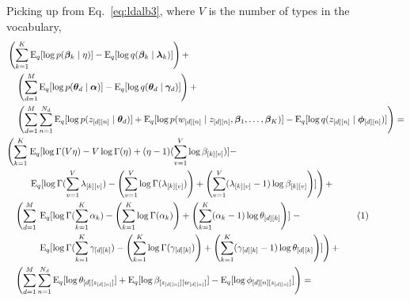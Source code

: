 \documentclass[12pt]{article}
\newcommand\numberthis{\addtocounter{equation}{1}\tag{\theequation}}
\newcommand{\E}{\operatorname{E}}
\begin{document}
Picking up from Eq.~\ref{eq:ldalb3}, where $V$ is the number of types in the
vocabulary,
\begin{align*}
    &\begin{aligned}
    &\left(\sum_{k=1}^{K} \E_{q}[\log p(\bm{\beta}_{k} \mid \eta)] - \E_{q}[\log
    q(\bm{\beta}_{k} \mid \bm{\lambda}_{k})]\right) + \\*
    &\quad\left(\sum_{d=1}^{M} \E_{q}[\log p(\bm{\theta}_{d} \mid \bm{\alpha})]
    - \E_{q}[\log q(\bm{\theta}_{d} \mid \bm{\gamma}_{d})]\right) + \\*
    &\quad\left(\sum_{d=1}^{M}\sum_{n=1}^{N_{d}} \E_{q}[\log p(z_{[d][n]} \mid
    \bm{\theta}_{d})] + \E_{q}[\log p(w_{[d][n]} \mid z_{[d][n]}, \bm{\beta}_{1},
    \ldots, \bm{\beta}_{K})] - \E_{q}[\log q(z_{[d][n]} \mid
    \bm{\phi}_{[d][n]})]\right) =
    \end{aligned}\\
    &\begin{aligned}
    &\begin{aligned}\left(\sum_{k=1}^{K} \right. &\E_{q}[ \log \Gamma(V\eta) -
    V \log \Gamma(\eta) + (\eta - 1) (\sum_{v=1}^{V} \log \beta_{[k][v]}) ] -
    \\*
    &\left. \E_{q} [ \log
    \Gamma(\sum_{v=1}^{V} \lambda_{[k][v]}) - \left(\sum_{v=1}^{V} \log
    \Gamma(\lambda_{[k][v]})\right) + \left(\sum_{v=1}^{V} (\lambda_{[k][v]} - 1) \log
    \beta_{[k][v]}\right)]\right) +\end{aligned} \\*
    &\quad\begin{aligned}\left(\sum_{d=1}^{M}\right. &\left.\E_{q}[\log \Gamma
    (\sum_{k=1}^{K}
    \alpha_{k}) - \left(\sum_{k=1}^{K}\log \Gamma(\alpha_{k})\right) +
    \left(\sum_{k=1}^{K}(\alpha_{k} - 1)\log \theta_{[d][k]}\right)]\right. -
    \\*
    &\left.\E_{q}[\log \Gamma(\sum_{k=1}^{K} \gamma_{[d][k]}) - \left(\sum_{k=1}^{K}
    \log \Gamma(\gamma_{[d][k]})\right) + \left(\sum_{k=1}^{K} (\gamma_{[d][k]} - 1)
    \log \theta_{[d][k]}\right)]\right) +
    \end{aligned}\\*
    &\quad\begin{aligned}
    \left(\sum_{d=1}^{M}\sum_{n=1}^{N_{d}} \E_{q}[\log \theta_{[d][z_{[d][n]}]}]
    + \E_{q}[\log \beta_{[z_{[d][n]}][w_{[d][n]}]}] -
    \E_{q}[\log \phi_{[d][n][z_{[d][n]}]}]\right) =
    \end{aligned}
    \end{aligned}\numberthis\label{eq:lbpdf1}\\

\end{align*}
\end{document}
